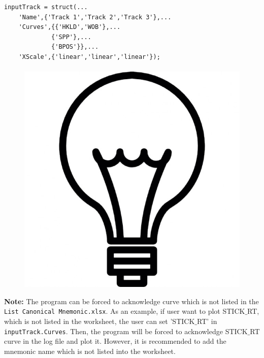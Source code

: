 \documentclass[12pt,a4paper,oneside]{report}
\begin{document}
\begin{lstlisting}[style=Matlab-editor]
inputTrack = struct(...
    'Name',{'Track 1','Track 2','Track 3'},...
    'Curves',{{'HKLD','WOB'},...
    	     {'SPP'},...
    	     {'BPOS'}},...
    'XScale',{'linear','linear','linear'});
\end{lstlisting}

\paragraph{}
\begin{figure}
\vspace{-15pt}
\includegraphics[scale=0.03]{fig/light_bulb.jpg}
\end{figure}
\noindent\textbf{Note:} The program can be forced to acknowledge curve which is not listed in the \texttt{List Canonical Mnemonic.xlsx}. As an example, if user want to plot STICK$\_$RT, which is not listed in the worksheet, the user can set 'STICK$\_$RT' in \texttt{inputTrack.Curves}. Then, the program will be forced to acknowledge STICK$\_$RT curve in the log file and plot it. However, it is recommended to add the mnemonic name which is not listed into the worksheet.
\end{document}
